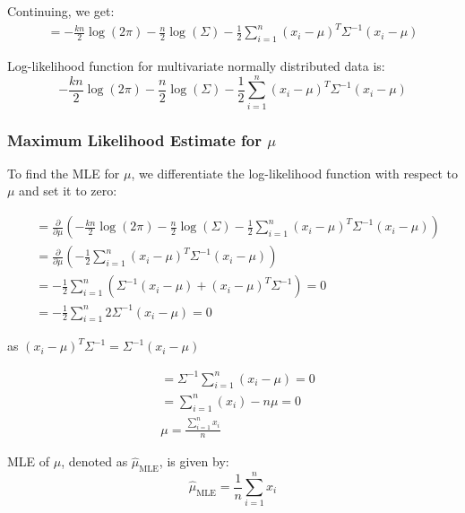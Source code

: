 \documentclass{beamer}
\begin{document}
\begin{frame}
    Continuing, we get:
    \begin{align*}
        = -\frac{kn}{2}\log(2\pi) -\frac{n}{2}\log(\Sigma) -\frac{1}{2}\sum_{i=1}^n (x_i-\mu)^T\Sigma^{-1}(x_i-\mu)  
        \end{align*}

    \begin{tcolorbox}[colback=metropolisblue!5,colframe=metropolisblue,title=Log Likelihood Function for Multivariate Normal Distribution]
            Log-likelihood function for multivariate normally distributed data is:
            \[
                -\frac{kn}{2}\log(2\pi) -\frac{n}{2}\log(\Sigma) -\frac{1}{2}\sum_{i=1}^n (x_i-\mu)^T\Sigma^{-1}(x_i-\mu)
                \]
        \end{tcolorbox}
\end{frame}

\begin{frame}
    \frametitle{Maximum Likelihood Estimate for $\mu$}
    
    To find the MLE for $\mu$, we differentiate the log-likelihood function with respect to $\mu$ and set it to zero:
    
    \begin{align*}
      &=\frac{\partial}{\partial \mu} \left(-\frac{kn}{2}\log(2\pi) -\frac{n}{2}\log(\Sigma) -\frac{1}{2}\sum_{i=1}^n (x_i-\mu)^T\Sigma^{-1}(x_i-\mu)\right) \\
      &= \frac{\partial}{\partial \mu} \left(-\frac{1}{2} \sum_{i=1}^n (x_i-\mu)^T\Sigma^{-1}(x_i-\mu)\right) \\
      &= -\frac{1}{2}\sum_{i=1}^n \left(\Sigma^{-1}(x_i-\mu) + (x_i-\mu)^T\Sigma^{-1} \right) = 0\\
      &= -\frac{1}{2} \sum_{i=1}^n 2\Sigma^{-1}(x_i-\mu) = 0 
    \end{align*} \centerline{as $(x_i-\mu)^{T}\Sigma^{-1} = \Sigma^{-1}(x_i-\mu)$}
    
\end{frame}

\begin{frame}
    
    \begin{align*}
      &=\Sigma^{-1}\sum_{i=1}^n(x_i-\mu) = 0 \\
      &=\sum_{i=1}^n(x_i) - n\mu = 0 \\
      &\mu = \frac{\sum_{i=1}^n x_i}{n}      
    \end{align*} 

    \begin{tcolorbox}[colback=metropolisblue!5,colframe=metropolisblue,title=Maximum Likelihood Estimate for $\mu$]
        MLE of $\mu$, denoted as $\hat{\mu}_{\text{MLE}}$, is given by:
        \begin{equation*}
            \hat{\mu}_{\text{MLE}} = \frac{1}{n}\sum_{i=1}^n x_i
        \end{equation*}
    \end{tcolorbox}
    
\end{frame}
\end{document}
